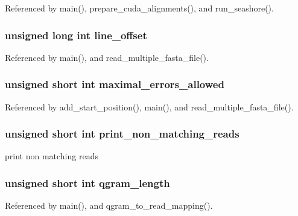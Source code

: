 Referenced by main(), prepare\_\-cuda\_\-alignments(), and run\_\-seashore().
\subsubsection[{line\_\-offset}]{\setlength{\rightskip}{0pt plus 5cm}unsigned long int {\bf line\_\-offset}}\label{saruman_8h_2356197c34d4150fc2c98d9ed2ccef11}




Referenced by main(), and read\_\-multiple\_\-fasta\_\-file().
\subsubsection[{maximal\_\-errors\_\-allowed}]{\setlength{\rightskip}{0pt plus 5cm}unsigned short int {\bf maximal\_\-errors\_\-allowed}}\label{saruman_8h_8036c9951f326930fb8da3f9eada65cb}




Referenced by add\_\-start\_\-position(), main(), and read\_\-multiple\_\-fasta\_\-file().
\subsubsection[{print\_\-non\_\-matching\_\-reads}]{\setlength{\rightskip}{0pt plus 5cm}unsigned short int {\bf print\_\-non\_\-matching\_\-reads}}\label{saruman_8h_a62460c85989c1db232083ed238caac4}


print non matching reads 
\subsubsection[{qgram\_\-length}]{\setlength{\rightskip}{0pt plus 5cm}unsigned short int {\bf qgram\_\-length}}\label{saruman_8h_dca41ef662c3741c7e78c3afc8fb52ec}




Referenced by main(), and qgram\_\-to\_\-read\_\-mapping().
